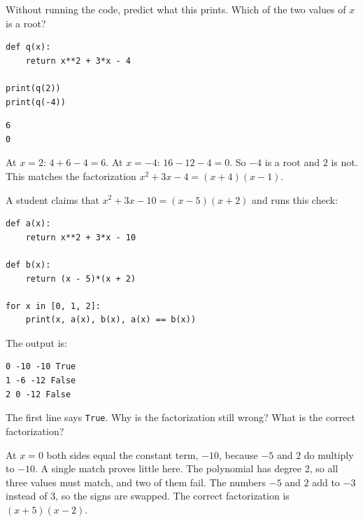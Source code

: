 \begin{Exercise}[title={Predict the output}, label={ex:factoring_polynomials-python-1}]
Without running the code, predict what this prints. Which of the two
values of $x$ is a root?
\begin{verbatim}
def q(x):
    return x**2 + 3*x - 4

print(q(2))
print(q(-4))
\end{verbatim}
\end{Exercise}
\begin{Answer}[ref={ex:factoring_polynomials-python-1}]
\begin{verbatim}
6
0
\end{verbatim}
At $x = 2$: $4 + 6 - 4 = 6$. At $x = -4$: $16 - 12 - 4 = 0$. So $-4$ is
a root and $2$ is not. This matches the factorization
$x^2 + 3x - 4 = (x + 4)(x - 1)$.
\end{Answer}

\begin{Exercise}[title={Spot the sign error}, label={ex:factoring_polynomials-python-2}]
A student claims that $x^2 + 3x - 10 = (x - 5)(x + 2)$ and runs this
check:
\begin{verbatim}
def a(x):
    return x**2 + 3*x - 10

def b(x):
    return (x - 5)*(x + 2)

for x in [0, 1, 2]:
    print(x, a(x), b(x), a(x) == b(x))
\end{verbatim}
The output is:
\begin{verbatim}
0 -10 -10 True
1 -6 -12 False
2 0 -12 False
\end{verbatim}
The first line says \texttt{True}. Why is the factorization
still wrong? What is the correct factorization?
\end{Exercise}
\begin{Answer}[ref={ex:factoring_polynomials-python-2}]
At $x = 0$ both sides equal the constant term, $-10$, because $-5$ and
$2$ do multiply to $-10$. A single match proves little here. The polynomial has
degree 2, so all three values must match, and two of them fail. The
numbers $-5$ and $2$ add to $-3$ instead of $3$, so the signs are
swapped. The correct factorization is $(x + 5)(x - 2)$.
\end{Answer}

